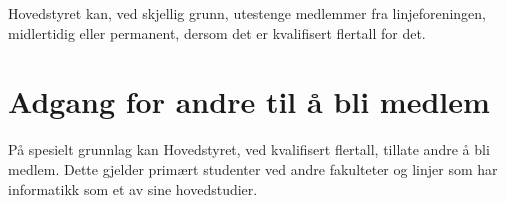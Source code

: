 Hovedstyret kan, ved skjellig grunn, utestenge medlemmer fra linjeforeningen, midlertidig eller permanent, dersom det er kvalifisert flertall for det. 


\section{Adgang for andre til å bli medlem}

På spesielt grunnlag kan Hovedstyret, ved kvalifisert flertall, tillate andre å bli medlem. Dette gjelder primært studenter ved andre fakulteter og linjer som har informatikk som et av sine hovedstudier.